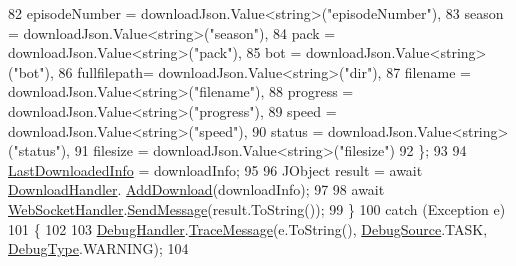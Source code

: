 \begin{DoxyCode}
82                     episodeNumber = downloadJson.Value<\textcolor{keywordtype}{string}>(\textcolor{stringliteral}{"episodeNumber"}),
83                     season = downloadJson.Value<\textcolor{keywordtype}{string}>(\textcolor{stringliteral}{"season"}),
84                     pack = downloadJson.Value<\textcolor{keywordtype}{string}>(\textcolor{stringliteral}{"pack"}),
85                     bot = downloadJson.Value<\textcolor{keywordtype}{string}>(\textcolor{stringliteral}{"bot"}),
86                     fullfilepath= downloadJson.Value<\textcolor{keywordtype}{string}>(\textcolor{stringliteral}{"dir"}),
87                     filename = downloadJson.Value<\textcolor{keywordtype}{string}>(\textcolor{stringliteral}{"filename"}),
88                     progress = downloadJson.Value<\textcolor{keywordtype}{string}>(\textcolor{stringliteral}{"progress"}),
89                     speed = downloadJson.Value<\textcolor{keywordtype}{string}>(\textcolor{stringliteral}{"speed"}),
90                     status = downloadJson.Value<\textcolor{keywordtype}{string}>(\textcolor{stringliteral}{"status"}),
91                     filesize = downloadJson.Value<\textcolor{keywordtype}{string}>(\textcolor{stringliteral}{"filesize"})
92                 \};
93 
94                 \mbox{\hyperlink{class_little_weeb_library_1_1_services_1_1_download_web_socket_service_a541fd25204120f3ee2b7f70deae533ce}{LastDownloadedInfo}} = downloadInfo;
95 
96                 JObject result = await \mbox{\hyperlink{class_little_weeb_library_1_1_handlers_1_1_download_handler}{DownloadHandler}}.
      \mbox{\hyperlink{class_little_weeb_library_1_1_handlers_1_1_download_handler_ad28cb47c19cac5e761ceff86ea021a02}{AddDownload}}(downloadInfo);
97 
98                 await \mbox{\hyperlink{class_little_weeb_library_1_1_handlers_1_1_web_socket_handler}{WebSocketHandler}}.\mbox{\hyperlink{class_little_weeb_library_1_1_handlers_1_1_web_socket_handler_a1de289d54d665a32c93478c68d3e6ad0}{SendMessage}}(result.ToString());
99             \}
100             \textcolor{keywordflow}{catch} (Exception e)
101             \{
102 
103                 \mbox{\hyperlink{class_little_weeb_library_1_1_handlers_1_1_debug_handler}{DebugHandler}}.\mbox{\hyperlink{class_little_weeb_library_1_1_handlers_1_1_debug_handler_afccb37dfd6b2114af72000c2f4fe4607}{TraceMessage}}(e.ToString(), 
      \mbox{\hyperlink{namespace_little_weeb_library_1_1_handlers_a2a6ca0775121c9c503d58aa254d292be}{DebugSource}}.TASK, \mbox{\hyperlink{namespace_little_weeb_library_1_1_handlers_ab66019ed40462876ec4e61bb3ccb0a62}{DebugType}}.WARNING);
104               

\end{DoxyCode}
